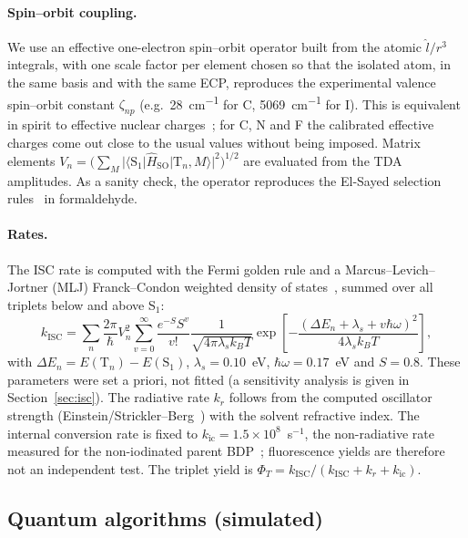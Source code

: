 \documentclass[journal=jpcafh,manuscript=article]{achemso}
\newcommand{\kisc}{k_\mathrm{ISC}}
\newcommand{\Hso}{\hat H_\mathrm{SO}}
\begin{document}
\paragraph{Spin--orbit coupling.} We use an effective one-electron spin--orbit operator built from
the atomic $\hat l/r^3$ integrals, with one scale factor per element chosen so that the isolated
atom, in the same basis and with the same ECP, reproduces the experimental valence spin--orbit
constant $\zeta_{np}$ (e.g.\ \SI{28}{cm^{-1}} for C, \SI{5069}{cm^{-1}} for I). This is equivalent in
spirit to effective nuclear charges~\cite{Koseki1992}; for C, N and F the calibrated effective
charges come out close to the usual values without being imposed. Matrix elements
$V_n=\bigl(\sum_M \lvert\langle \mathrm{S}_1\rvert\Hso\lvert\mathrm{T}_n,M\rangle\rvert^2\bigr)^{1/2}$
are evaluated from the TDA amplitudes. As a sanity check, the operator reproduces the El-Sayed
selection rules~\cite{ElSayed1963} in formaldehyde.

\paragraph{Rates.} The ISC rate is computed with the Fermi golden rule and a
Marcus--Levich--Jortner (MLJ) Franck--Condon weighted density of states~\cite{Jortner1976},
summed over all triplets below and above S$_1$:
\begin{equation}
  \kisc = \sum_n \frac{2\pi}{\hbar} V_n^2
  \sum_{v=0}^{\infty} \frac{e^{-S}S^v}{v!}
  \frac{1}{\sqrt{4\pi\lambda_s k_BT}}
  \exp\!\left[-\frac{(\Delta E_n + \lambda_s + v\hbar\omega)^2}{4\lambda_s k_BT}\right],
  \label{eq:mlj}
\end{equation}
with $\Delta E_n=E(\mathrm{T}_n)-E(\mathrm{S}_1)$, $\lambda_s=0.10$~eV, $\hbar\omega=0.17$~eV and
$S=0.8$. These parameters were set a priori, not fitted (a sensitivity analysis is given in
Section~\ref{sec:isc}). The radiative rate $k_r$ follows from the computed oscillator strength
(Einstein/Strickler--Berg~\cite{Strickler1962}) with the solvent refractive index. The internal
conversion rate is fixed to $k_\mathrm{ic}=1.5\times10^{8}$~s$^{-1}$, the non-radiative rate
measured for the non-iodinated parent BDP~\cite{Ly2021}; fluorescence yields are therefore not an
independent test. The triplet yield is $\Phi_T=\kisc/(\kisc+k_r+k_\mathrm{ic})$.

\subsection{Quantum algorithms (simulated)}
\end{document}
